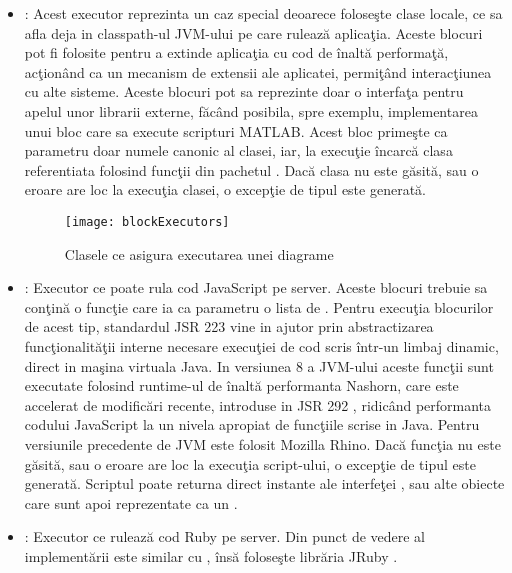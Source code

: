 \begin{itemize}
	\item {}: Acest executor reprezinta un caz special deoarece foloseşte clase locale, ce sa afla deja in classpath-ul JVM-ului pe care rulează aplicaţia. Aceste blocuri pot fi folosite pentru a extinde aplicaţia cu cod de înaltă performaţă, acţionând ca un mecanism de extensii ale aplicatei, permiţând interacţiunea cu alte sisteme. Aceste blocuri pot sa reprezinte doar o interfaţa pentru apelul unor librarii externe, făcând posibila, spre exemplu, implementarea unui bloc care sa execute scripturi MATLAB.
	Acest bloc primeşte ca parametru doar numele canonic al clasei, iar, la execuţie încarcă clasa referentiata folosind funcţii din pachetul . Dacă clasa nu este găsită, sau o eroare are loc la execuţia clasei, o excepţie de tipul  este generată.
	\begin{figure}[H]
		\centering
		\texttt{[image: blockExecutors]}
		\caption{Clasele ce asigura executarea unei diagrame}
		\label{fig:blockExecutors}
	\end{figure}
	\item {}: Executor ce poate rula cod JavaScript pe server. Aceste blocuri trebuie sa conţină o funcţie  care ia ca parametru o lista de . Pentru execuţia blocurilor de acest tip, standardul JSR 223 \autocite{JSR223} vine in ajutor prin abstractizarea funcţionalităţii interne necesare execuţiei de cod scris într-un limbaj dinamic, direct in maşina virtuala Java. In versiunea 8 a JVM-ului aceste funcţii sunt executate folosind runtime-ul de înaltă performanta Nashorn, care este accelerat de modificări recente, introduse in JSR 292  \autocite{JSR292}, ridicând performanta codului JavaScript la un nivela apropiat de funcţiile scrise in Java. Pentru versiunile precedente de JVM este folosit Mozilla Rhino. Dacă funcţia   nu este găsită, sau o eroare are loc la execuţia script-ului, o excepţie de tipul  este generată. Scriptul poate returna direct instante ale interfeţei , sau alte obiecte care sunt apoi reprezentate ca un .
	
	\item {}: Executor ce rulează cod Ruby pe server. Din punct de vedere al implementării este similar cu , însă foloseşte librăria JRuby \autocite{jruby} .
	
\end{itemize}

